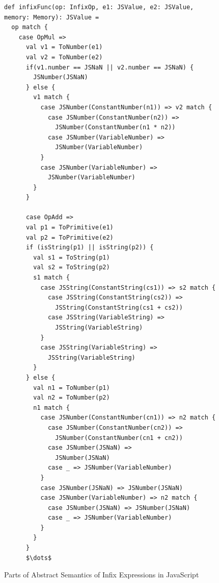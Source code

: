 \documentclass{article}
\begin{document}


\begin{figure}
  \lstset{language=Scala, mathescape}
  \begin{lstlisting}
def infixFunc(op: InfixOp, e1: JSValue, e2: JSValue, memory: Memory): JSValue =
  op match {
    case OpMul =>
      val v1 = ToNumber(e1)
      val v2 = ToNumber(e2)
      if(v1.number == JSNaN || v2.number == JSNaN) {
        JSNumber(JSNaN)
      } else {
        v1 match {
          case JSNumber(ConstantNumber(n1)) => v2 match {
            case JSNumber(ConstantNumber(n2)) =>
              JSNumber(ConstantNumber(n1 * n2))
            case JSNumber(VariableNumber) =>
              JSNumber(VariableNumber)
          }
          case JSNumber(VariableNumber) =>
            JSNumber(VariableNumber)
        }
      }

      case OpAdd =>
      val p1 = ToPrimitive(e1)
      val p2 = ToPrimitive(e2)
      if (isString(p1) || isString(p2)) {
        val s1 = ToString(p1)
        val s2 = ToString(p2)
        s1 match {
          case JSString(ConstantString(cs1)) => s2 match {
            case JSString(ConstantString(cs2)) =>
              JSString(ConstantString(cs1 + cs2))
            case JSString(VariableString) =>
              JSString(VariableString)
          }
          case JSString(VariableString) =>
            JSString(VariableString)
        }
      } else {
        val n1 = ToNumber(p1)
        val n2 = ToNumber(p2)
        n1 match {
          case JSNumber(ConstantNumber(cn1)) => n2 match {
            case JSNumber(ConstantNumber(cn2)) =>
              JSNumber(ConstantNumber(cn1 + cn2))
            case JSNumber(JSNaN) =>
              JSNumber(JSNaN)
            case _ => JSNumber(VariableNumber)
          }
          case JSNumber(JSNaN) => JSNumber(JSNaN)
          case JSNumber(VariableNumber) => n2 match {
            case JSNumber(JSNaN) => JSNumber(JSNaN)
            case _ => JSNumber(VariableNumber)
          }
        }
      }
      $\dots$
  \end{lstlisting}
  \caption{Parts of Abstract Semantics of Infix Expressions in JavaScript}
\label{fig:infix}
\end{figure}
\fi
\end{document}
